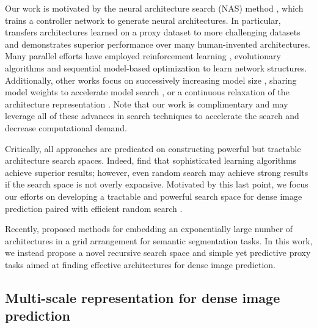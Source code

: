 \documentclass{article}
\begin{document}
Our work is motivated by the neural architecture search (NAS) method \cite{zoph2017neural, zoph2017learning}, which trains a controller network to generate neural architectures. In particular, \cite{zoph2017learning} transfers architectures learned on a proxy dataset \cite{krizhevsky2009learning} to more challenging datasets \cite{ILSVRC15} and demonstrates superior performance over many human-invented architectures.
Many parallel efforts have employed reinforcement learning \cite{baker2017designing, zhong2018practical}, evolutionary algorithms \cite{stanley2002evolving, real2017large,miikkulainen2017evolving, xie2017genetic, liu2018hierarchical, real2018regularized} and sequential model-based optimization \cite{negrinho2017deeparchitect, liu2018progressive} to learn network structures. Additionally, other works focus on successively increasing model size \cite{cai2018efficient,Chen2016}, sharing model weights to accelerate model search \cite{pham2018efficient}, or a continuous relaxation of the architecture representation  \cite{liu2018darts}. Note that our work is complimentary and may leverage all of these advances in search techniques to accelerate the search and decrease computational demand.

Critically, all approaches are predicated on constructing powerful but tractable architecture search spaces. Indeed, \cite{liu2018progressive, zoph2017learning,real2018regularized} find that sophisticated learning algorithms achieve superior results; however, even random search may achieve strong results if the search space is not overly expansive. Motivated by this last point, we focus our efforts on developing a tractable and powerful search space for dense image prediction paired with efficient random search \cite{bergstra2012random, golovin2017google}.

Recently, \cite{saxena2016convolutional, fourure2017residual} proposed methods for embedding an exponentially large number of architectures in a grid arrangement for semantic segmentation tasks. In this work, we instead propose a novel recursive search space and simple yet predictive proxy tasks aimed at finding effective architectures for dense image prediction. 




\subsection{Multi-scale representation for dense image prediction}
\end{document}
